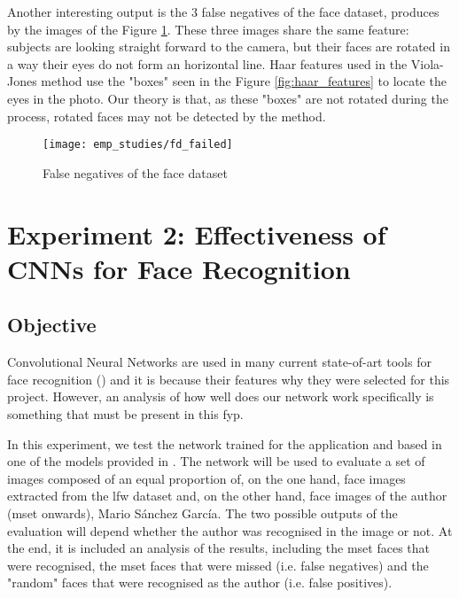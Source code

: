 	Another interesting output is the 3 false negatives of the face dataset, produces by the images of the Figure \ref{fig:failed_detection}. These three images share the same feature: subjects are looking straight forward to the camera, but their faces are rotated in a way their eyes do not form an horizontal line. Haar features used in the Viola-Jones method use the "boxes" seen in the Figure \ref{fig:haar_features} to locate the eyes in the photo. Our theory is that, as these "boxes" are not rotated during the process, rotated faces may not be detected by the method. 

	\begin{figure}[!ht]
		\centering
		\texttt{[image: emp\_studies/fd\_failed]}
		\caption{False negatives of the face dataset}
		\label{fig:failed_detection}
	\end{figure}



                                                       

\section{Experiment 2: Effectiveness of CNNs for Face Recognition}
	\subsection{Objective}
	Convolutional Neural Networks are used in many current state-of-art tools for face recognition (\cite{facenet_article}) and it is because their features why they were selected for this project. However, an analysis of how well does our network work specifically is something that must be present in this \gls{fyp}. 

	In this experiment, we test the network trained for the application and based in one of the models provided in \cite{facenet_github}. The network will be used to evaluate a set of images composed of an equal proportion of, on the one hand, face images extracted from the \gls{lfw} dataset and, on the other hand, face images of the author (\gls{mset} onwards), Mario Sánchez García. The two possible outputs of the evaluation will depend whether the author was recognised in the image or not. At the end, it is included an analysis of the results, including the \gls{mset} faces that were recognised, the \gls{mset} faces that were missed (i.e. false negatives) and the "random" faces that were recognised as the author (i.e. false positives). 

